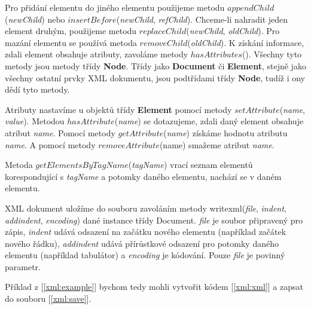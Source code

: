 Pro přidání elementu do jiného elementu použijeme metodu $appendChild$(\textit{newChild}) nebo $insertBefore$(\textit{newChild}, \textit{refChild}). Chceme-li nahradit jeden element druhým, použijeme metodu $replaceChild$(\textit{newChild}, \textit{oldChild}). Pro mazání elementu se používá metoda $removeChild$(\textit{oldChild}). K získání informace, zdali element obsahuje atributy, zavoláme metody $hasAttributes$(). Všechny tyto metody jsou metody třídy \textbf{Node}. Třídy jako \textbf{Document} či \textbf{Element}, stejně jako všechny ostatní prvky XML dokumentu, jsou podtřídami třídy \textbf{Node}, tudíž i ony dědí tyto metody.

Atributy nastavíme u objektů třídy \textbf{Element} pomocí metody $setAttribute$(\textit{name}, \textit{value}). Metodou $hasAttribute$(\textit{name}) se dotazujeme, zdali daný element obsahuje atribut \textit{name}. Pomocí metody $getAttribute$(\textit{name}) získáme hodnotu atributu \textit{name}. A pomocí metody $removeAttribute$(name) smažeme atribut \textit{name}.

Metoda $getElementsByTagName$(\textit{tagName}) vrací seznam elementů korespondující s \textit{tagName} a potomky daného elementu, nachází se v daném elementu.

XML dokument uložíme do souboru zavoláním metody writexml(\textit{file}, \textit{indent}, \textit{addindent}, \textit{encoding}) dané instance třídy Document. \textit{file} je soubor připravený pro zápis, \textit{indent} udává odsazení na začátku nového elementu (například začátek nového řádku), \textit{addindent} udává přírůstkové odsazení pro potomky daného elementu (například tabulátor) a \textit{encoding} je kódování. Pouze \textit{file} je povinný parametr. 

Příklad z [\autoref{xml:example}] bychom tedy mohli vytvořit kódem [\autoref{xml:xml}] a zapsat do souboru [\autoref{xml:save}]. \\

